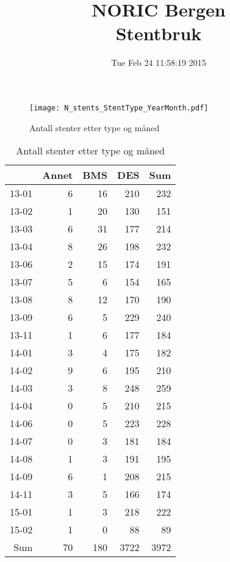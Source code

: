 \documentclass[presentation,xcolor=pdftex,dvipsnames,table]{beamer}
\title{NORIC Bergen \\Stentbruk}\date{ Tue Feb 24 11:58:19 2015 }
\begin{document}
\maketitle



\begin{frame}
\begin{figure}
  \centering
  \caption{Antall stenter etter type og måned}
  

\texttt{[image: N\_stents\_StentType\_YearMonth.pdf]}
\end{figure}
\end{frame}



\begin{frame}
\begin{tiny}
\begin{table}[ht]
\centering
\begin{tabular}{rrrrr}
  \toprule
 & Annet & BMS & DES & Sum \\ 
  \midrule
13-01 & 6 & 16 & 210 & 232 \\ 
  13-02 & 1 & 20 & 130 & 151 \\ 
  13-03 & 6 & 31 & 177 & 214 \\ 
  13-04 & 8 & 26 & 198 & 232 \\ 
  13-06 & 2 & 15 & 174 & 191 \\ 
  13-07 & 5 & 6 & 154 & 165 \\ 
  13-08 & 8 & 12 & 170 & 190 \\ 
  13-09 & 6 & 5 & 229 & 240 \\ 
  13-11 & 1 & 6 & 177 & 184 \\ 
  14-01 & 3 & 4 & 175 & 182 \\ 
  14-02 & 9 & 6 & 195 & 210 \\ 
  14-03 & 3 & 8 & 248 & 259 \\ 
  14-04 & 0 & 5 & 210 & 215 \\ 
  14-06 & 0 & 5 & 223 & 228 \\ 
  14-07 & 0 & 3 & 181 & 184 \\ 
  14-08 & 1 & 3 & 191 & 195 \\ 
  14-09 & 6 & 1 & 208 & 215 \\ 
  14-11 & 3 & 5 & 166 & 174 \\ 
  15-01 & 1 & 3 & 218 & 222 \\ 
  15-02 & 1 & 0 & 88 & 89 \\ 
  Sum & 70 & 180 & 3722 & 3972 \\ 
   \bottomrule
\end{tabular}
\caption{Antall stenter etter type og måned} 
\end{table}\end{tiny}
\end{frame}
\end{document}
